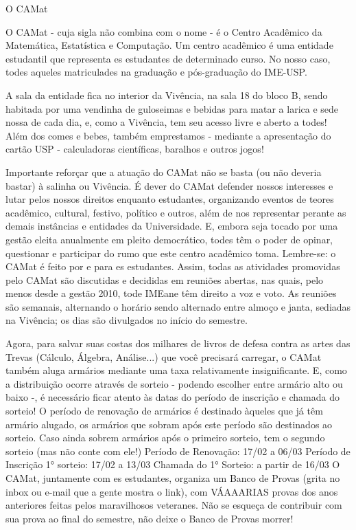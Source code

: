\begin{secao}{O CAMat}

O CAMat - cuja sigla não combina com o nome - é o Centro Acadêmico da Matemática, Estatística e Computação.  Um centro acadêmico é uma entidade estudantil que representa es estudantes de determinado curso. No nosso caso, todes aqueles matriculades na graduação e pós-graduação do IME-USP.

A sala da entidade fica no interior da Vivência, na sala 18 do bloco B, sendo habitada por uma vendinha de guloseimas e bebidas para matar a larica e sede nossa de cada dia, e, como a Vivência, tem seu acesso livre e aberto a todes! Além dos comes e bebes, também emprestamos - mediante a apresentação do cartão USP - calculadoras científicas, baralhos e outros jogos!

Importante reforçar que a atuação do CAMat não se basta (ou não deveria bastar) à salinha ou Vivência. É dever do CAMat defender nossos interesses e lutar pelos nossos direitos enquanto estudantes, organizando eventos de teores acadêmico, cultural, festivo, político e outros, além de nos representar perante as demais instâncias e entidades da Universidade. E, embora seja tocado por uma gestão eleita anualmente em pleito democrático, todes têm o poder de opinar, questionar e participar do rumo que este centro acadêmico toma. Lembre-se: o CAMat é feito por e para es estudantes. Assim, todas as atividades promovidas pelo CAMat são discutidas e decididas em reuniões abertas, nas quais, pelo menos desde a gestão 2010, tode IMEane têm direito a voz e voto. As reuniões são semanais, alternando o horário sendo alternado entre almoço e janta, sediadas na Vivência; os dias são divulgados no início do semestre.

Agora, para salvar suas costas dos milhares de livros de defesa contra as artes das Trevas (Cálculo, Álgebra, Análise...) que você precisará carregar, o CAMat também aluga armários mediante uma taxa relativamente insignificante. E, como a distribuição ocorre através de sorteio - podendo escolher entre armário alto ou baixo -, é necessário ficar atento às datas do período de inscrição e chamada do sorteio! O período de renovação de armários é destinado àqueles que já têm armário alugado, os armários que sobram após este período são destinados ao sorteio. Caso ainda sobrem armários após o primeiro sorteio, tem o segundo sorteio (mas não conte com ele!)
Período de Renovação: 17/02 a 06/03
Período de Inscrição 1° sorteio: 17/02 a 13/03
Chamada do 1° Sorteio: a partir de 16/03
O CAMat, juntamente com es estudantes, organiza um Banco de Provas (grita no inbox ou e-mail que a gente mostra o link), com VÁAAARIAS provas dos anos anteriores feitas pelos maravilhosos veteranes. Não se esqueça de contribuir com sua prova ao final do semestre, não deixe o Banco de Provas morrer!
  

\end{secao}
